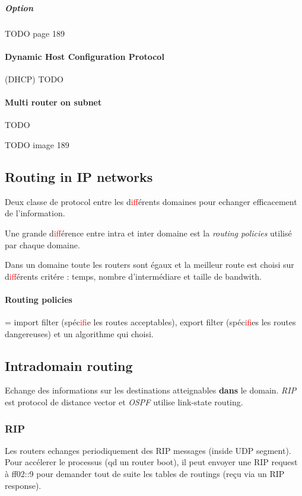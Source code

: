 \subparagraph{Option}
TODO page 189

\paragraph{Dynamic Host Configuration Protocol} (DHCP)
TODO

\paragraph{Multi router on subnet}
TODO



TODO image 189

\subsection{Routing in IP networks}
Deux classe de protocol entre les d\textcolor{red}{if}férents domaines pour echanger
efficacement de l'information.

Une grande d\textcolor{red}{if}férence entre intra et inter domaine est la \textit{routing policies}
utilisé par chaque domaine.

Dans un domaine toute les routers sont égaux et la meilleur route est choisi sur
d\textcolor{red}{if}férents critére : temps, nombre d'intermédiare et taille de bandwith.

\paragraph{Routing  policies}  =  import filter  (spéc\textcolor{red}{if}ie  les  routes
acceptables), export  filter (spéc\textcolor{red}{if}ies  les routes dangereuses)  et un
algorithme qui choisi.


\subsection{Intradomain routing}
Echange des informations sur les destinations atteignables \textbf{dans} le domain.
\textit{RIP} est protocol de distance vector et \textit{OSPF} utilise link-state routing.

\subsubsection{RIP}
Les routers echanges periodiquement des RIP messages (inside UDP segment).
Pour accélerer le processus (qd un router boot), il peut envoyer une RIP request à ff02::9
pour demander tout de suite les tables de routings (reçu via un RIP response).

